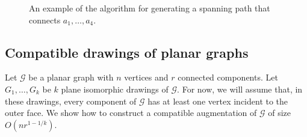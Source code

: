 \documentclass[11pt]{patmorin}
\begin{document}
\begin{figure}
   \caption{An example of the algorithm for generating a spanning path that connects $a_1,\ldots,a_4$.}
   \label{figure:big-example}
\end{figure}

\subsection{Compatible drawings of planar graphs}
Let $\mathcal G$ be a planar graph with $n$ vertices and $r$ connected
components.  Let $G_1, \ldots, G_k$ be $k$ plane isomorphic drawings
of $\mathcal G$.  For now, we will assume that, in these drawings,
every component of $\mathcal G$ has at least one vertex incident to
the outer face.  
We show how to construct a compatible augmentation of $\mathcal G$
of size $O(nr^{1-1/k})$.
\end{document}
